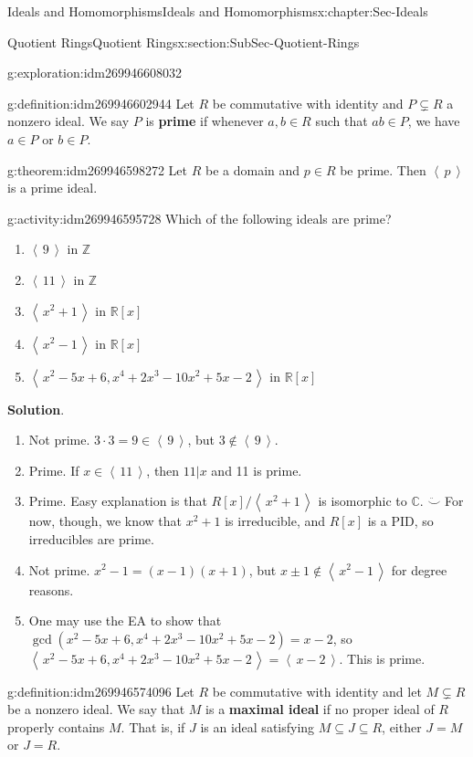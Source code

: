 \documentclass[oneside,10pt,]{book}
\newcommand{\terminology}[1]{\textbf{#1}}
\numberwithin{equation}{section}
\newcommand{\ideal}[1]{\left\langle\, #1 \,\right\rangle}
\def\C{{\mathbb C}}
\def\Z{{\mathbb Z}}
\def\R{{\mathbb R}}
\begin{document}
\begin{chapterptx}{Ideals and Homomorphisms}{}{Ideals and Homomorphisms}{}{}{x:chapter:Sec-Ideals}
\begin{sectionptx}{Quotient Rings}{}{Quotient Rings}{}{}{x:section:SubSec-Quotient-Rings}
\begin{exploration}{}{g:exploration:idm269946608032}
\end{exploration}
\begin{definition}{}{g:definition:idm269946602944}%
Let \(R\) be commutative with identity and \(P\subsetneq R\) a nonzero ideal. We say \(P\) is \terminology{prime} if whenever \(a,b\in R\) such that \(ab\in P\), we have \(a\in P\) or \(b\in P\).%
\end{definition}
\begin{theorem}{}{}{g:theorem:idm269946598272}%
Let \(R\) be a domain and \(p\in R\) be prime. Then \(\ideal{p}\) is a prime ideal.%
\end{theorem}
\begin{activity}{}{g:activity:idm269946595728}%
Which of the following ideals are prime?%
\begin{enumerate}
\item{}\(\ideal{9}\) in \(\Z\)%
\item{}\(\ideal{11}\) in \(\Z\)%
\item{}\(\ideal{x^2+1}\) in \(\R[x]\)%
\item{}\(\ideal{x^2-1}\) in \(\R[x]\)%
\item{}\(\ideal{x^2-5x+6, x^4+2x^3-10x^2+5x-2}\) in \(\R[x]\)%
\end{enumerate}
%
\par\smallskip%
\noindent\textbf{Solution}.\hypertarget{g:solution:idm269946585728}{}\quad{}%
\begin{enumerate}
\item{}Not prime. \(3\cdot 3= 9\in \ideal{9}\), but \(3\notin\ideal{9}\).%
\item{}Prime. If \(x\in \ideal{11}\), then \(11|x\) and 11 is prime.%
\item{}Prime. Easy explanation is that \(R[x]/\ideal{x^2+1}\) is isomorphic to \(\C\). \(\ddot\smile\) For now, though, we know that \(x^2+1\) is irreducible, and \(R[x]\) is a PID, so irreducibles are prime.%
\item{}Not prime. \(x^2-1 = (x-1)(x+1)\), but \(x\pm 1\notin \ideal{x^2-1}\) for degree reasons.%
\item{}One may use the EA to show that \(\gcd(x^2-5x+6,x^4+2x^3-10x^2+5x-2) = x-2\), so \(\ideal{x^2-5x+6, x^4+2x^3-10x^2+5x-2} = \ideal{x-2}\). This is prime.%
\end{enumerate}
%
\end{activity}
\begin{definition}{}{g:definition:idm269946574096}%
Let \(R\) be commutative with identity and let \(M\subsetneq R\) be a nonzero ideal. We say that \(M\) is a \terminology{maximal ideal} if no proper ideal of \(R\) properly contains \(M\). That is, if \(J\) is an ideal satisfying \(M\subseteq J\subseteq R\), either \(J=M\) or \(J=R\).%

\end{definition}
\end{sectionptx}
\end{chapterptx}
\end{document}
